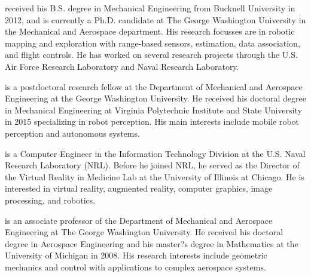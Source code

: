 \documentclass[smallextended]{svjour3}       %
\begin{document}



\vspace*{0.1\textwidth}

 received his B.S. degree in Mechanical Engineering from Bucknell University in 2012, and is currently a Ph.D. candidate at The George Washington University in the Mechanical and Aerospace department. His research focusses are in robotic mapping and exploration with range-based sensors, estimation, data association, and flight controls. He has worked on several research projects through the U.S. Air Force Research Laboratory and Naval Research Laboratory.

\vspace*{0.1\textwidth}

 is a postdoctoral research fellow at the Department of Mechanical and Aerospace Engineering at the George Washington University. He received his doctoral degree in Mechanical Engineering at Virginia Polytechnic Institute and State University in 2015 specializing in robot perception. His main interests include mobile robot perception and autonomous systems.

\vspace*{0.1\textwidth}

 is a Computer Engineer in the Information Technology Division at the U.S. Naval Research Laboratory (NRL). Before he joined NRL, he served as the Director of the Virtual Reality in Medicine Lab at the University of Illinois at Chicago. He is interested in virtual reality, augmented reality, computer graphics, image processing, and robotics.

\vspace*{0.1\textwidth}

 is an associate professor of the Department of Mechanical and Aerospace Engineering at The George Washington University. He received his doctoral degree in Aerospace Engineering and his master?s degree in Mathematics at the University of Michigan in 2008. His research interests include geometric mechanics and control with applications to complex aerospace systems.
\end{document}
